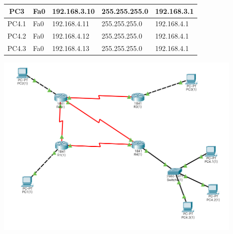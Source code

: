 \begin{center}
\begin{tabular}{|c|l|l|l|l|}
        \hline
        PC3                 & Fa0       & 192.168.3.10 & 255.255.255.0 & 192.168.3.1     \\
        \hline
        PC4.1               & Fa0       & 192.168.4.11 & 255.255.255.0 & 192.168.4.1     \\
        \hline
        PC4.2               & Fa0       & 192.168.4.12 & 255.255.255.0 & 192.168.4.1     \\
        \hline
        PC4.3               & Fa0       & 192.168.4.13 & 255.255.255.0 & 192.168.4.1     \\
        \hline
    \end{tabular}
\end{center}

\includegraphics[width=0.9\textwidth]{resources/top2}
